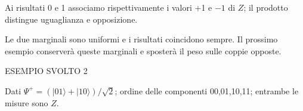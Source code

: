 
Ai risultati 0 e 1 associamo rispettivamente i valori +1 e \(- 1\) di \(Z\); il prodotto distingue uguaglianza e opposizione.\par



Le due marginali sono uniformi e i risultati coincidono sempre. Il prossimo esempio conserverà queste marginali e sposterà il peso sulle coppie opposte.\par


\Needspace{.36\textheight}\label{c2-composti-example-2}
{\sffamily\small\color{Accent} ESEMPIO SVOLTO 2\par}
Dati \(\Psi ^{+}=(|01\rangle +|10\rangle )/\sqrt{2}\); ordine delle componenti 00,01,10,11; entrambe le misure sono \(Z\).\par


